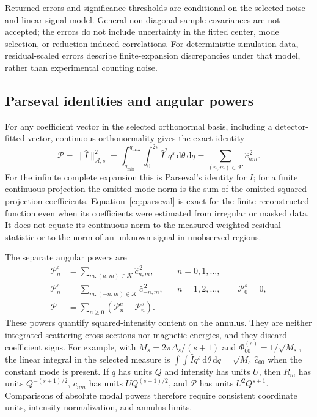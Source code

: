 \documentclass[aps,prb,preprint,onecolumn,notitlepage,amsmath,amssymb,
  superscriptaddress,floatfix]{revtex4-2}
\newcommand{\dd}{\,\mathrm{d}}
\newcommand{\Ann}{\mathcal{A}}
\newcommand{\Modes}{\mathcal{K}}
\begin{document}
Returned errors and significance thresholds are conditional on the
selected noise and linear-signal model. General non-diagonal sample
covariances are not accepted; the errors do not include uncertainty in the fitted center,
mode selection, or reduction-induced correlations. For deterministic
simulation data, residual-scaled errors describe finite-expansion
discrepancies under that model, rather than experimental counting noise.

\subsection{Parseval identities and angular powers}

For any coefficient vector in the selected orthonormal basis, including a
detector-fitted vector, continuous orthonormality gives the exact identity
\begin{equation}
 \mathcal{P}=\|\widehat I\|_{\Ann,s}^2
 =\int_{q_{\min}}^{q_{\max}}\int_0^{2\pi}
  \widehat I^2q^s\dd\theta\dd q
 =\sum_{(n,m)\in\Modes}\widehat c_{nm}^{\,2}.
 \label{eq:parseval}
\end{equation}
For the infinite complete expansion this is Parseval's identity for $I$;
for a finite continuous projection the omitted-mode norm is the sum of the
omitted squared projection coefficients. Equation~\eqref{eq:parseval}
is exact for the finite reconstructed function even when its coefficients
were estimated from irregular or masked data. It does not equate its
continuous norm to the measured weighted residual statistic or to the
norm of an unknown signal in unobserved regions.

The separate angular powers are
\begin{align}
 \mathcal{P}_n^c&=\sum_{m:(n,m)\in\Modes}\widehat c_{n,m}^{\,2},
 &&n=0,1,\ldots,\nonumber\\
 \mathcal{P}_n^s&=\sum_{m:(-n,m)\in\Modes}\widehat c_{-n,m}^{\,2},
 &&n=1,2,\ldots,\qquad \mathcal{P}_0^s=0,
 \label{eq:angular-power}\\
 \mathcal{P}&=\sum_{n\geq0}(\mathcal{P}_n^c+\mathcal{P}_n^s).
 \nonumber
\end{align}
These powers quantify squared-intensity content on the annulus. They are
neither integrated scattering cross sections nor magnetic energies, and
they discard coefficient signs. For example, with
$M_s=2\pi\Delta_s/(s+1)$ and $\Phi_{00}^{(s)}=1/\sqrt{M_s}$,
the linear integral in the selected measure is
$\int\!\!\int\widehat Iq^s\dd\theta\dd q
=\sqrt{M_s}\,\widehat c_{00}$ when the constant mode is present.
If $q$ has units $Q$ and intensity has units $U$, then $R_m$ has units
$Q^{-(s+1)/2}$, $c_{nm}$ has units $UQ^{(s+1)/2}$, and $\mathcal{P}$
has units $U^2Q^{s+1}$.
Comparisons of absolute modal powers therefore require consistent
coordinate units, intensity normalization, and annulus limits.
\end{document}
